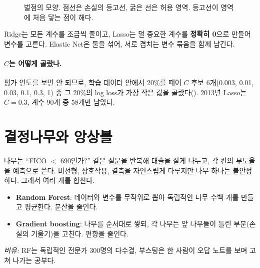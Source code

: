\begin{figure}[H]\centering
{}
\caption{벌점의 모양. 점선은 손실의 등고선, 굵은 선은 허용 영역. 등고선이 영역에 처음 닿는 점이 해다.}
\end{figure}

\begin{keybox}[L1과 L2]
Ridge는 모든 계수를 조금씩 줄이고, Lasso는 덜 중요한 계수를 \textbf{정확히 0}으로 만들어 변수를 고른다. Elastic Net은 둘을 섞어, 서로 겹치는 변수 묶음을 함께 남긴다.
\end{keybox}

\paragraph{$C$는 어떻게 골랐나.} 평가 연도를 보면 안 되므로, 학습 데이터 안에서 20\%를 떼어 $C$ 후보 6개(0.003, 0.01, 0.03, 0.1, 0.3, 1) 중 그 20\%의 log loss가 가장 작은 값을 골랐다(). 2013년 Lasso는 $C=0.3$, 계수 90개 중 58개만 남았다.

\section{결정나무와 앙상블}
나무는 ``FICO $<$ 690인가?'' 같은 질문을 반복해 대출을 잘게 나누고, 각 칸의 부도율을 예측으로 쓴다. 비선형, 상호작용, 결측을 자연스럽게 다루지만 나무 하나는 불안정하다. 그래서 여러 개를 합친다.
\begin{itemize}[leftmargin=*]
\item \textbf{Random Forest}: 데이터와 변수를 무작위로 뽑아 독립적인 나무 수백 개를 만들고 평균한다. 분산을 줄인다.
\item \textbf{Gradient boosting}: 나무를 순서대로 쌓되, 각 나무는 앞 나무들이 틀린 부분(손실의 기울기)을 고친다. 편향을 줄인다.
\end{itemize}
\textit{비유:} RF는 독립적인 전문가 300명의 다수결, 부스팅은 한 사람이 오답 노트를 보며 고쳐 나가는 공부다.

